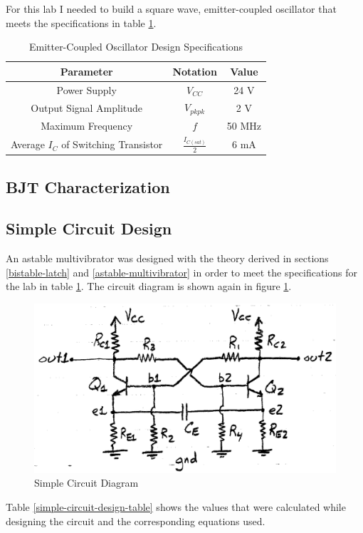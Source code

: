 \documentclass[titlepage, letterpaper, 10.5pt]{article}
\begin{document}
For this lab I needed to build a square wave, emitter-coupled oscillator
that meets the specifications in table \ref{specs-table}.

\begin{table}[ht]
\centering
\caption{Emitter-Coupled Oscillator Design Specifications}
\begin{tabular}{c | c | c}
\hline\hline
Parameter	&Notation	&Value	\\
\hline\hline
Power Supply	&$V_{CC}$	&24 V	\\
Output Signal Amplitude	&$V_{pkpk}$	&2 V	\\
Maximum Frequency	&$f$	&50 MHz	\\
Average $I_{C}$ of Switching Transistor	&$\frac{I_{C(sat)}}{2}$	&6 mA	\\
\hline\hline
\end{tabular}
\label{specs-table}
\end{table}

\subsection{BJT Characterization}

\subsection{Simple Circuit Design}

An astable multivibrator was designed with the theory derived in sections
\ref{bistable-latch} and \ref{astable-multivibrator} in order to meet the
specifications for the lab in table \ref{specs-table}.
The circuit diagram is shown again in figure \ref{simple-circuit-2}.

\begin{figure}[ht]
	\centering
	\includegraphics[width=.5\textwidth]{diagrams/simple-circuit}
	\caption{Simple Circuit Diagram}
	\label{simple-circuit-2}
\end{figure}

Table \ref{simple-circuit-design-table} shows the values that were calculated
while designing the circuit and the corresponding equations used.
\end{document}
